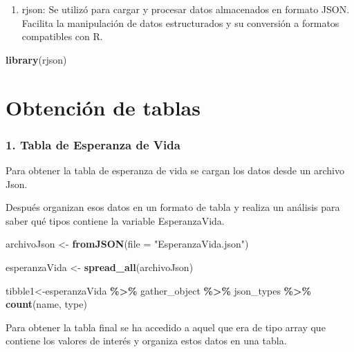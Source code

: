 \documentclass[
]{article}
\newenvironment{Shaded}{\begin{snugshade}}{\end{snugshade}}
\newcommand{\AttributeTok}[1]{\textcolor[rgb]{0.13,0.29,0.53}{#1}}
\newcommand{\FunctionTok}[1]{\textcolor[rgb]{0.13,0.29,0.53}{\textbf{#1}}}
\newcommand{\NormalTok}[1]{#1}
\newcommand{\OtherTok}[1]{\textcolor[rgb]{0.56,0.35,0.01}{#1}}
\newcommand{\SpecialCharTok}[1]{\textcolor[rgb]{0.81,0.36,0.00}{\textbf{#1}}}
\newcommand{\StringTok}[1]{\textcolor[rgb]{0.31,0.60,0.02}{#1}}
\providecommand{\tightlist}{%
  \setlength{\itemsep}{0pt}\setlength{\parskip}{0pt}}
\begin{document}
\begin{enumerate}
\def\labelenumi{\arabic{enumi}.}
\setcounter{enumi}{3}
\tightlist
\item
  rjson: Se utilizó para cargar y procesar datos almacenados en formato
  JSON. Facilita la manipulación de datos estructurados y su conversión
  a formatos compatibles con R.
\end{enumerate}

\begin{Shaded}
\begin{Highlighting}[]
\FunctionTok{library}\NormalTok{(rjson) }
\end{Highlighting}
\end{Shaded}

\hypertarget{obtenciuxf3n-de-tablas}{%
\section{Obtención de tablas}\label{obtenciuxf3n-de-tablas}}

\hypertarget{tabla-de-esperanza-de-vida}{%
\subsubsection{1. Tabla de Esperanza de
Vida}\label{tabla-de-esperanza-de-vida}}

Para obtener la tabla de esperanza de vida se cargan los datos desde un
archivo Json.

Después organizan esos datos en un formato de tabla y realiza un
análisis para saber qué tipos contiene la variable EsperanzaVida.

\begin{Shaded}
\begin{Highlighting}[]
\NormalTok{archivoJson }\OtherTok{\textless{}{-}} \FunctionTok{fromJSON}\NormalTok{(}\AttributeTok{file =} \StringTok{"EsperanzaVida.json"}\NormalTok{)}

\NormalTok{esperanzaVida }\OtherTok{\textless{}{-}} \FunctionTok{spread\_all}\NormalTok{(archivoJson)}

\NormalTok{tibble1}\OtherTok{\textless{}{-}}\NormalTok{esperanzaVida }\SpecialCharTok{\%\textgreater{}\%} 
\NormalTok{  gather\_object }\SpecialCharTok{\%\textgreater{}\%}  
\NormalTok{  json\_types }\SpecialCharTok{\%\textgreater{}\%} 
  \FunctionTok{count}\NormalTok{(name, type)}
\end{Highlighting}
\end{Shaded}

Para obtener la tabla final se ha accedido a aquel que era de tipo array
que contiene los valores de interés y organiza estos datos en una tabla.
\end{document}
